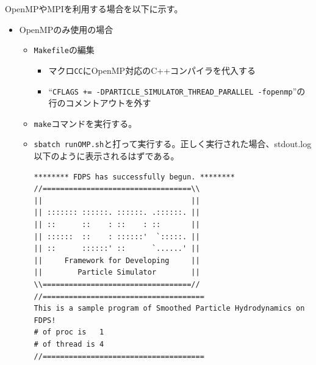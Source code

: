 \documentclass[12pt,a4paper,dvipdfmx]{jarticle}
\begin{document}
OpenMPやMPIを利用する場合を以下に示す。
\begin{itemize}
\item OpenMPのみ使用の場合
  \begin{itemize}
  \item \texttt{Makefile}の編集
    \begin{itemize}
    \item マクロ\texttt{CC}にOpenMP対応のC++コンパイラを代入する
    \item ``\texttt{CFLAGS += -DPARTICLE\_SIMULATOR\_THREAD\_PARALLEL -fopenmp}''の
      行のコメントアウトを外す
    \end{itemize}
  \item \texttt{make}コマンドを実行する。
  \item \texttt{sbatch runOMP.sh}と打って実行する。正しく実行された場合、stdout.log以下のように表示されるはずである。
\begin{screen}
\begin{verbatim}
******** FDPS has successfully begun. ********
//==================================\\
||                                  ||
|| ::::::: ::::::. ::::::. .::::::. ||
|| ::      ::    : ::    : ::       ||
|| ::::::  ::    : ::::::'  `:::::. ||
|| ::      ::::::' ::      `......' ||
||     Framework for Developing     ||
||        Particle Simulator        ||
\\==================================//
//=====================================
This is a sample program of Smoothed Particle Hydrodynamics on FDPS!
# of proc is   1
# of thread is 4
//=====================================
\end{verbatim}
\end{screen}
  \end{itemize}


\end{itemize}
\end{document}
